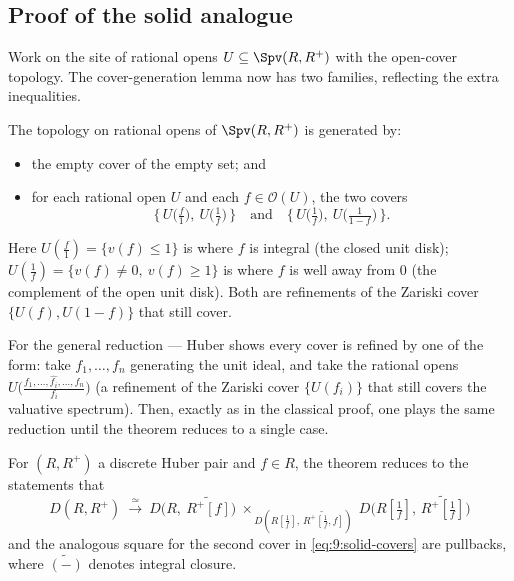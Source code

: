 \subsection{Proof of the solid analogue}

Work on the site of rational opens $U\subseteq\Spv(R,R^{+})$ with the open-cover
topology. The cover-generation lemma now has two families, reflecting the extra
inequalities.

\begin{lemma}
\label{lem:9:solid-covers}
The topology on rational opens of $\Spv(R,R^{+})$ is generated by:
\begin{itemize}
\item the empty cover of the empty set; and
\item for each rational open $U$ and each $f\in\mathcal O(U)$, the two covers
\begin{equation}
\label{eq:9:solid-covers}
\bigl\{\,U\bigl(\tfrac{f}{1}\bigr),\ U\bigl(\tfrac1f\bigr)\,\bigr\}\quad\text{and}
\quad\bigl\{\,U\bigl(\tfrac1f\bigr),\ U\bigl(\tfrac1{1-f}\bigr)\,\bigr\}.
\end{equation}
\end{itemize}
Here $U(\tfrac f1)=\{v(f)\le 1\}$ is where $f$ is integral (the closed unit
disk); $U(\tfrac1f)=\{v(f)\neq 0,\ v(f)\ge 1\}$ is where $f$ is well away from
$0$ (the complement of the open unit disk). Both are refinements of the Zariski
cover $\{U(f),U(1-f)\}$ that still cover.
\end{lemma}

For the general reduction --- Huber shows every cover is refined by one of the
form: take $f_{1},\dots,f_{n}$ generating the unit ideal, and take the rational
opens $U\bigl(\tfrac{f_{1},\dots,\widehat{f_{i}},\dots,f_{n}}{f_{i}}\bigr)$
(a refinement of the Zariski cover $\{U(f_{i})\}$ that still covers the valuative
spectrum). Then, exactly as in the classical proof, one plays the same reduction
until the theorem reduces to a single case.

\begin{proposition}
\label{prop:9:solid-squares}
For $(R,R^{+})$ a discrete Huber pair and $f\in R$, the theorem reduces to the
statements that
\begin{equation*}
D(R,R^{+})\ \xrightarrow{\ \simeq\ }\ D\bigl(R,\ \widetilde{R^{+}[f]}\bigr)\
\times_{\,D(R[\frac1f],\,\widetilde{R^{+}[\frac1f,f]})}\ D\bigl(R[\tfrac1f],\,
\widetilde{R^{+}[\tfrac1f]}\bigr)
\end{equation*}
and the analogous square for the second cover in \eqref{eq:9:solid-covers} are
pullbacks, where $\widetilde{(-)}$ denotes integral closure.
\end{proposition}

